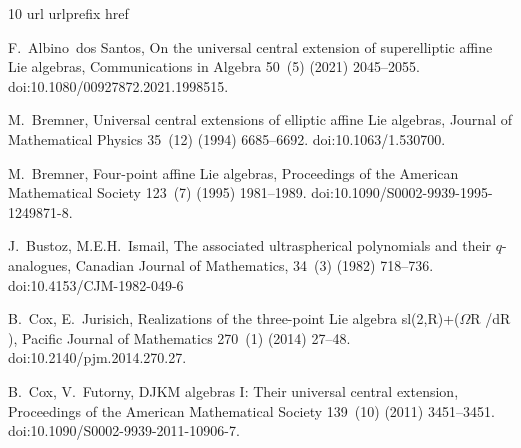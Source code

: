 \documentclass[review,nopreprintline]{elsarticle}
\theoremstyle{definition}
\numberwithin{equation}{section}
\theoremstyle{remark}
\begin{document}
	 
	   
	
	\begin{thebibliography}{10}
	\expandafter\ifx\csname url\endcsname\relax
	  \def\url#1{\texttt{#1}}\fi
	\expandafter\ifx\csname urlprefix\endcsname\relax\def\urlprefix{URL }\fi
	\expandafter\ifx\csname href\endcsname\relax
	  \def\href#1#2{#2} \def\path#1{#1}\fi
	
	
	
	F.~Albino~dos Santos, {On the universal central extension of superelliptic
	  affine Lie algebras}, Communications in Algebra 50~(5) (2021) 2045--2055.
	  \newblock
	  \href
	  {https://doi.org/10.1080/00927872.2021.1998515}
	  {\path{doi:10.1080/00927872.2021.1998515}}.
	
	M.~Bremner, {Universal central extensions of elliptic affine Lie algebras},
	  Journal of Mathematical Physics 35~(12) (1994) 6685--6692.
	\newblock \href {https://doi.org/10.1063/1.530700}
	  {\path{doi:10.1063/1.530700}}.
	
	M.~Bremner, {Four-point affine Lie algebras}, Proceedings of the American
	  Mathematical Society 123~(7) (1995) 1981--1989.
	\newblock \href {https://doi.org/10.1090/S0002-9939-1995-1249871-8}
	  {\path{doi:10.1090/S0002-9939-1995-1249871-8}}.
	
	 J.~Bustoz, M.E.H.~Ismail, {The associated ultraspherical polynomials and their $q$-analogues}, Canadian Journal of Mathematics, 34~(3) (1982) 718--736.
	\newblock \href {https://doi.org/10.4153/CJM-1982-049-6}
	  {\path{doi:10.4153/CJM-1982-049-6}}
	
	B.~Cox, E.~Jurisich, {Realizations of the three-point Lie algebra
	  sl(2,R)+({$\Omega$}R /dR )}, Pacific Journal of Mathematics 270~(1) (2014)
	  27--48.
	\newblock \href {https://doi.org/10.2140/pjm.2014.270.27}
	  {\path{doi:10.2140/pjm.2014.270.27}}.
	
	
	
	
	B.~Cox, V.~Futorny, {DJKM algebras I: Their universal central extension},
	  Proceedings of the American Mathematical Society 139~(10) (2011) 3451--3451.
	\newblock \href {https://doi.org/10.1090/S0002-9939-2011-10906-7}
	  {\path{doi:10.1090/S0002-9939-2011-10906-7}}.
	

\end{thebibliography}
\end{document}
